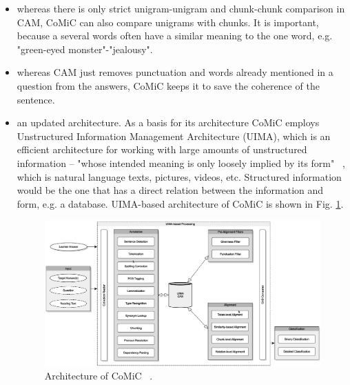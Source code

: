 \documentclass[11pt]{report}
\numberwithin{equation}{section} %
\begin{document}
\begin{itemize}
\item whereas there is only strict unigram-unigram and chunk-chunk comparison in CAM, CoMiC can also compare unigrams with chunks. It is important, because a several words often have a similar meaning to the one word, e.g. "green-eyed monster"-"jealousy".
\item whereas CAM just removes punctuation and words already mentioned in a question from the answers, CoMiC keeps it to save the coherence of the sentence.
\item an updated architecture.  As a basis for its architecture CoMiC employs  Unstructured Information Management Architecture (UIMA), which is an efficient architecture for working with large amounts of unstructured information -- "whose intended meaning is only loosely implied by its form" ~\cite{UIMA}, which is natural language texts, pictures, videos, etc. Structured information would be the one that has a direct relation between the information and form, e.g. a database. UIMA-based architecture of CoMiC is shown in Fig. \ref{fig:UIMA}.

\begin{figure}[h!]
  \centering
  \includegraphics[width=\textwidth]{img/UIMA}
    \caption{ Architecture of CoMiC ~\cite{CoMiC-EN}. }\label{fig:UIMA}
\end{figure}


\end{itemize}
\end{document}
